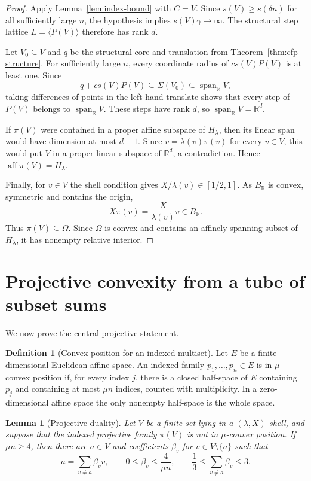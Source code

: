 \documentclass[11pt,reqno]{amsart}
\newtheorem{lemma}[theorem]{Lemma}
\theoremstyle{definition}
\newtheorem{definition}[theorem]{Definition}
\theoremstyle{remark}
\newcommand{\R}{\mathbb R}
\newcommand{\Span}{\operatorname{span}}
\newcommand{\aff}{\operatorname{aff}}
\newcommand{\SigmaSet}{\Sigma}
\begin{document}
\begin{proof}
Apply Lemma~\ref{lem:index-bound} with $C=V$.  Since
$s(V)\ge s(\delta n)$ for all sufficiently large $n$, the hypothesis implies
$s(V)\gamma\to\infty$.  The structural step lattice $L=\langle P(V)\rangle$
therefore has rank $d$.

Let $V_0\subseteq V$ and $q$ be the structural core and translation from
Theorem~\ref{thm:cfp-structure}.  For sufficiently large $n$, every coordinate
radius of $cs(V)P(V)$ is at least one.  Since
\[
 q+cs(V)P(V)\subseteq\SigmaSet(V_0)\subseteq\Span_{\R}V,
\]
taking differences of points in the left-hand translate shows that every step
of $P(V)$ belongs to $\Span_{\R}V$.  These steps have rank $d$, so
$\Span_{\R}V=\R^d$.

If $\pi(V)$ were contained in a proper affine subspace of $H_\lambda$, then
its linear span would have dimension at most $d-1$.  Since
$v=\lambda(v)\pi(v)$ for every $v\in V$, this would put $V$ in a proper
linear subspace of $\R^d$, a contradiction.  Hence
$\aff\pi(V)=H_\lambda$.

Finally, for $v\in V$ the shell condition gives $X/\lambda(v)\in[1/2,1]$.
As $B_{\R}$ is convex, symmetric and contains the origin,
\[
 X\pi(v)=\frac{X}{\lambda(v)}v\in B_{\R}.
\]
Thus $\pi(V)\subseteq\Omega$.  Since $\Omega$ is convex and contains an
affinely spanning subset of $H_\lambda$, it has nonempty relative interior.
\end{proof}

\section{Projective convexity from a tube of subset sums}
\label{sec:projective-convexity}

We now prove the central projective statement.

\begin{definition}[Convex position for an indexed multiset]
Let $E$ be a finite-dimensional Euclidean affine space.  An indexed family
$p_1,\dots,p_n\in E$ is in $\mu$-convex position if, for every index $j$,
there is a closed half-space of $E$ containing $p_j$ and containing at most
$\mu n$ indices, counted with multiplicity.  In a zero-dimensional affine
space the only nonempty half-space is the whole space.
\end{definition}

\begin{lemma}[Projective duality]
\label{lem:projective-duality}
Let $V$ be a finite set lying in a $(\lambda,X)$-shell, and suppose that the indexed projective family $\pi(V)$ is not in $\mu$-convex position.  If $\mu n\ge4$, then there are $a\in V$ and coefficients $\beta_v$ for $v\in V\setminus\{a\}$ such that
\[
 a=\sum_{v\ne a}\beta_vv,
 \qquad
 0\le\beta_v\le\frac{4}{\mu n},
 \qquad
 \frac13\le\sum_{v\ne a}\beta_v\le3.
\]
\end{lemma}
\end{document}

